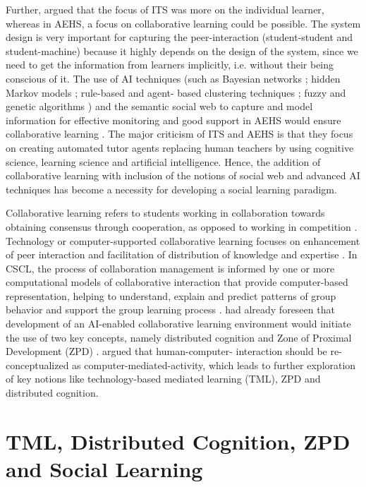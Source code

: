\begin{multicols}{2}
Further, \cite{art2-key35} argued that the focus of ITS was more on the individual learner, whereas in AEHS, a focus on collaborative learning could be possible. The system design is very important for capturing the peer-interaction (student-student and student-machine) because it highly depends on the design of the system, since we need to get the information from learners implicitly, i.e. without their being conscious of it. The use of AI techniques (such as Bayesian networks \cite{art2-key41}; hidden Markov models \cite{art2-key47}; rule-based and agent- based clustering techniques \cite{art2-key38}; fuzzy and genetic algorithms \cite{art2-key12}) and the semantic social web \cite{art2-key23} to capture and model information for effective monitoring and good support in AEHS would ensure collaborative learning \cite{art2-key35}. The major criticism of ITS and AEHS is that they focus on creating automated tutor agents replacing human teachers by using cognitive science, learning science and artificial intelligence. Hence, the addition of collaborative learning with inclusion of the notions of social web and advanced AI techniques has become a necessity for developing a social learning paradigm.

Collaborative learning refers to students working in collaboration towards obtaining consensus through cooperation, as opposed to working in competition  \cite{art2-key37}. Technology or computer-supported collaborative learning focuses on enhancement of peer interaction and facilitation of distribution of knowledge and expertise  \cite{art2-key33}. In CSCL, the process of collaboration management is informed by one or more computational models of collaborative interaction that provide computer-based representation, helping to understand, explain and predict patterns of group behavior and support the group learning process  \cite{art2-key48}.  \cite{art2-key36} had already foreseen that development of an AI-enabled collaborative learning environment would initiate the use of two key concepts, namely distributed cognition \cite{art2-key20} and Zone of Proximal Development (ZPD) \cite{art2-key51}. \cite{art2-key24} argued that human-computer- interaction should be re-conceptualized as computer-mediated-activity, which leads to further exploration of key notions like technology-based mediated learning (TML), ZPD and distributed cognition.

\section{TML, Distributed Cognition, ZPD and Social Learning}


\end{multicols}
